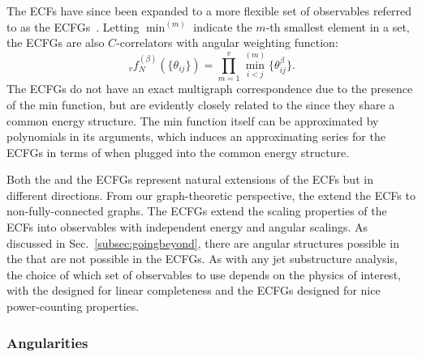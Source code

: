 \documentclass[letterpaper,11pt]{article}
\DeclareRobustCommand{\Sec}[1]{Sec.~\ref{#1}}
\newcommand{\Bs}{\text{EFPs}\xspace}
\begin{document}
The ECFs have since been expanded to a more flexible set of observables referred to as the ECFGs~\cite{Moult:2016cvt}. 
%
Letting $\min^{(m)}$ indicate the $m$-th smallest element in a set, the ECFGs are also $C$-correlators with angular weighting function:
\begin{equation}\label{eq:ecfgs}
\,_vf_N^{(\beta)}(\{\theta_{ij}\}) =  \prod_{m=1}^v \min_{i<j}^{(m)}\{ \theta^\beta_{ij}\}.
\end{equation}
%
The ECFGs do not have an exact multigraph correspondence due to the presence of the min function, but are evidently closely related to the \Bs since they share a common energy structure. 
%
The min function itself can be approximated by polynomials in its arguments, which induces an approximating series for the ECFGs in terms of \Bs when plugged into the common energy structure.

Both the \Bs and the ECFGs represent natural extensions of the ECFs but in different directions.
%
From our graph-theoretic perspective, the \Bs extend the ECFs to non-fully-connected graphs.
%
The ECFGs extend the scaling properties of the ECFs into observables with independent energy and angular scalings.
%
As discussed in \Sec{subsec:goingbeyond}, there are angular structures possible in the \Bs that are not possible in the ECFGs.
%
As with any jet substructure analysis, the choice of which set of observables to use depends on the physics of interest, with the \Bs designed for linear completeness and the ECFGs designed for nice power-counting properties.


\subsubsection{Angularities}
\label{sec:angularities}
\end{document}
